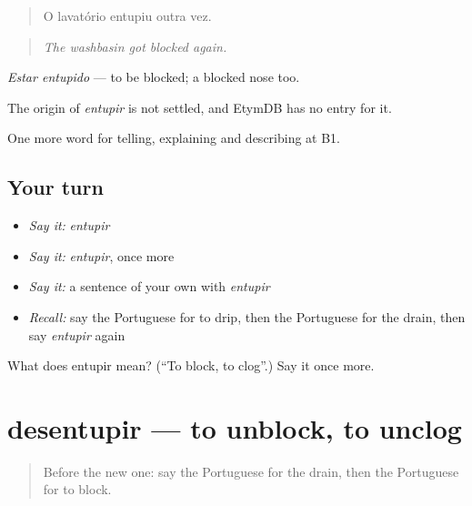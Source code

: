 \begin{quote}
O lavatório entupiu outra vez.
\end{quote}

\begin{quote}
\emph{The washbasin got blocked again.}
\end{quote}

\emph{Estar entupido} — to be blocked; a blocked nose too.

\begin{cousinweb}
The origin of \emph{entupir} is not settled, and EtymDB has no entry for it.
\end{cousinweb}

\begin{grammarlens}[title={What you've built}]
One more word for telling, explaining and describing at B1.
\end{grammarlens}

\subsection*{Your turn}
\begin{itemize}
\raggedright
  \item \emph{Say it:} \emph{entupir}
  \item \emph{Say it:} \emph{entupir}, once more
  \item \emph{Say it:} a sentence of your own with \emph{entupir}
  \item \emph{Recall:} say the Portuguese for to drip, then the Portuguese for the drain, then say \emph{entupir} again
\end{itemize}

\begin{tcolorbox}[breakable,colback=teal!4,colframe=teal!35!black,title={Before you move on}]
What does entupir mean? (\textquotedblleft{}To block, to clog\textquotedblright{}.) Say it once more.
\end{tcolorbox}
\section[desentupir]{desentupir — to unblock, to unclog}

\label{lesson:PT-C430-desentupir}



\begin{quote}
Before the new one: say the Portuguese for the drain, then the Portuguese for to block.
\end{quote}


